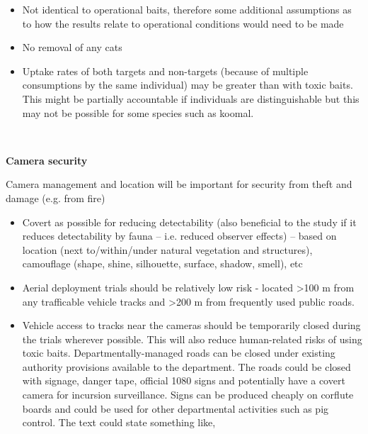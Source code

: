 \documentclass[version=last,
    paper=a4,                               %
    10pt,                                   %
    dvipsnames,
    oneside,                              %
    headings=openany,                       %
    open=any,
    BCOR=7mm,                               %
    DIV=15,     %
]{scrbook}
\begin{document}
\begin{itemize}
\itemsep1pt\parskip0pt
\item
  Not identical to operational baits, therefore some additional
  assumptions as to how the results relate to operational conditions
  would need to be made
\item
  No removal of any cats
\item
  Uptake rates of both targets and non-targets (because of multiple
  consumptions by the same individual) may be greater than with toxic
  baits. This might be partially accountable if individuals are
  distinguishable but this may not be possible for some species such as
  koomal.
\end{itemize}

~

\textbf{Camera security}

Camera management and location will be important for security from theft
and damage (e.g. from fire)

\begin{itemize}
\itemsep1pt\parskip0pt
\item
  Covert as possible for reducing detectability (also beneficial to the
  study if it reduces detectability by fauna -- i.e. reduced observer
  effects) -- based on location (next to/within/under natural vegetation
  and structures), camouflage (shape, shine, silhouette, surface,
  shadow, smell), etc
\item
  Aerial deployment trials should be relatively low risk - located
  \textgreater{}100 m from any trafficable vehicle tracks and
  \textgreater{}200 m from frequently used public roads.
\item
  Vehicle access to tracks near the cameras should be temporarily closed
  during the trials wherever possible. This will also reduce
  human-related risks of using toxic baits. Departmentally-managed roads
  can be closed under existing authority provisions available to the
  department. The roads could be closed with signage, danger tape,
  official 1080 signs and potentially have a covert camera for incursion
  surveillance. Signs can be produced cheaply on corflute boards and
  could be used for other departmental activities such as pig control.
  The text could state something like,
\end{itemize}

~

~
\end{document}
